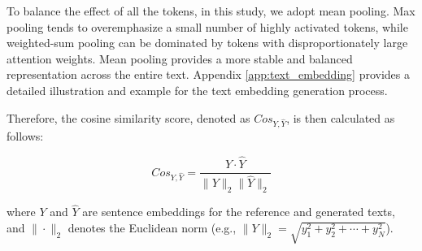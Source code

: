







 
To balance the effect of all the tokens, in this study, we adopt mean pooling. Max pooling tends to overemphasize a small number of highly activated tokens, while weighted-sum pooling can be dominated by tokens with disproportionately large attention weights. Mean pooling provides a more stable and balanced representation across the entire text. Appendix \ref{app:text_embedding} provides a detailed illustration and example for the text embedding generation process. 


Therefore, the cosine similarity score, denoted as $Cos_{Y, \hat{Y}}$, is then calculated as follows:


\begin{equation*}
    Cos_{Y, \hat{Y}} = \frac{Y \cdot \hat{Y}}{\|Y\|_2 \|\hat{Y}\|_2}
\end{equation*}


where $Y$ and $\hat{Y}$ are sentence embeddings for the reference and generated texts, and $\|\cdot\|_2$ denotes the Euclidean norm (e.g., $\|Y\|_2=\sqrt{y_1^2+y_2^2+\cdots+y_N^2}$).


